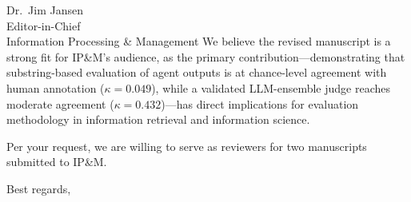 \documentclass[11pt]{letter}
\begin{document}
\begin{letter}{Dr.\ Jim Jansen\\Editor-in-Chief\\Information Processing \& Management}
We believe the revised manuscript is a strong fit for IP\&M's audience,
as the primary contribution---demonstrating that substring-based evaluation
of agent outputs is at chance-level agreement with human annotation
($\kappa=0.049$), while a validated LLM-ensemble judge reaches moderate
agreement ($\kappa=0.432$)---has direct implications for evaluation
methodology in information retrieval and information science.

Per your request, we are willing to serve as reviewers for two manuscripts
submitted to IP\&M.

\closing{Best regards,}

\end{letter}
\end{document}

